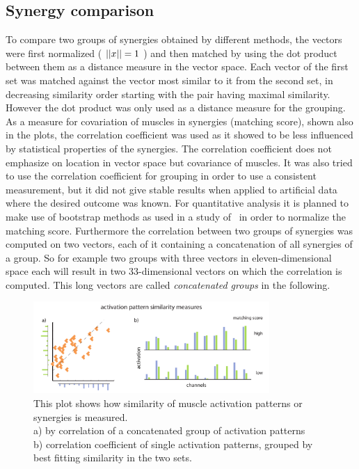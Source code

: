 \subsection{Synergy comparison} %
\label{sg:sub:comp}
To compare two groups of synergies obtained by different methods, the vectors were first normalized ( $\left|\left|x\right|\right| = 1$ ) and then matched by using the dot product between them as a distance measure in the vector space. Each vector of the first set was matched against the vector most similar to it from the second set, in decreasing similarity order starting with the pair having maximal similarity. However the dot product was only used as a distance measure for the grouping. As a measure for covariation of muscles in synergies (matching score), shown also in the plots, the correlation coefficient was used as it showed to be less influenced by statistical properties of the synergies. The correlation coefficient does not emphasize on location in vector space but covariance of muscles. It was also tried to use the correlation coefficient for grouping in order to use a consistent measurement, but it did not give stable results when applied to artificial data where the desired outcome was known. For quantitative analysis it is planned to make use of bootstrap methods as used in a study of~\citet{AdAvella:2005p2330} in order to normalize the matching score. Furthermore the correlation between two groups of synergies was computed on two vectors, each of it containing a concatenation of all synergies of a group. So for example two groups with three vectors in eleven-dimensional space each will result in two 33-dimensional vectors on which the correlation is computed. This long vectors are called \emph{concatenated groups} in the following.
\begin{figure}[ht]
	\centering
		\includegraphics[width=0.8\textwidth]{images/match_explanation.pdf}
	\caption{
This plot shows how similarity of muscle activation patterns or synergies is measured. \\ a) by correlation of a concatenated group of activation patterns \\
b) correlation coefficient of single activation patterns, grouped by best fitting similarity in the two sets. }
	\label{sg:fig:images_match_explanation}
\end{figure}

